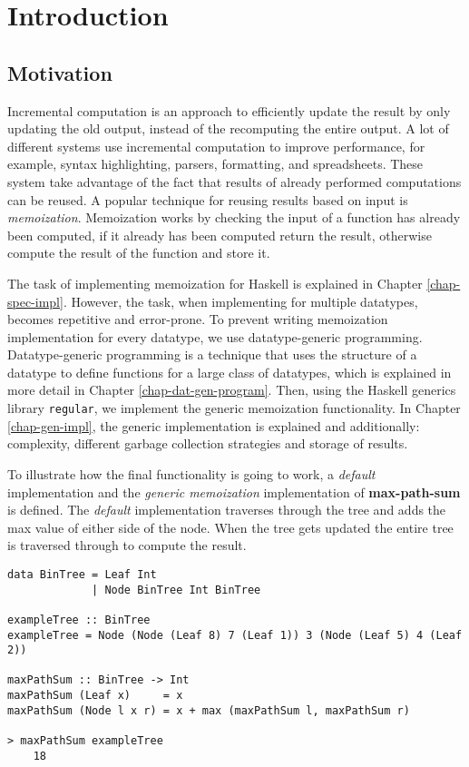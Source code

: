 \chapter{Introduction}

\section{Motivation}
Incremental computation is an approach to efficiently update the result by only updating the old output, instead of the recomputing the entire output. A lot of different systems use incremental computation to improve performance, for example, syntax highlighting, parsers, formatting, and spreadsheets. These system take advantage of the fact that results of already performed computations can be reused. A popular technique for reusing results based on input is \textit{memoization}. Memoization works by checking the input of a function has already been computed, if it already has been computed return the result, otherwise compute the result of the function and store it. 

The task of implementing memoization for Haskell is explained in Chapter \ref*{chap-spec-impl}. However, the task, when implementing for multiple datatypes, becomes repetitive and error-prone. To prevent writing memoization implementation for every datatype, we use datatype-generic programming. Datatype-generic programming is a technique that uses the structure of a datatype to define functions for a large class of datatypes, which is explained in more detail in Chapter \ref*{chap-dat-gen-program}. Then, using the Haskell generics library \texttt{regular}, we implement the generic memoization functionality. In Chapter \ref*{chap-gen-impl}, the generic implementation is explained and additionally: complexity, different garbage collection strategies and storage of results. 

To illustrate how the final functionality is going to work, a \textit{default} implementation  and the \textit{generic memoization} implementation of \textbf{max-path-sum} is defined. The \textit{default} implementation traverses through the tree and adds the max value of either side of the node. When the tree gets updated the entire tree is traversed through to compute the result.

\begin{verbatim}
data BinTree = Leaf Int
             | Node BinTree Int BinTree 
             
exampleTree :: BinTree    
exampleTree = Node (Node (Leaf 8) 7 (Leaf 1)) 3 (Node (Leaf 5) 4 (Leaf 2))

maxPathSum :: BinTree -> Int
maxPathSum (Leaf x)     = x
maxPathSum (Node l x r) = x + max (maxPathSum l, maxPathSum r)

> maxPathSum exampleTree
    18
\end{verbatim}

